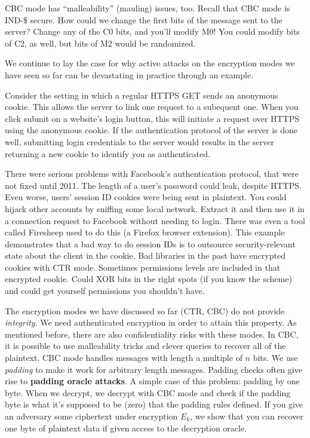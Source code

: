 CBC mode has ``malleability'' (mauling) issues, too. Recall that CBC mode is IND-\$ secure. How could we change the first bits of the message sent to the server?  Change any of the C0 bits, and you'll modify M0!
You could modify bits of C2, as well, but bits of M2 would be randomized.

We continue to lay the case for why active attacks on the encryption modes we have seen so far can be devastating in practice through an example.

\begin{example} Consider the setting in which a regular HTTPS GET sends an anonymous cookie. This allows the server to link one request to a subequent one. When you click submit on a website's login button, this will initiate a request over HTTPS using the anonymous cookie. If the authentication protocol of the server is done well, submitting login credentials to the server would results in the server returning a new cookie to identify you as authenticated.

There were serious problems with Facebook's authentication protocol, that were not fixed until 2011. The length of a user's password could leak, despite HTTPS.
Even worse, users' session ID cookies were being sent in plaintext. You could hijack other accounts by sniffing some local network. Extract it and then use it in a connection request to Facebook without needing to login. There was even a tool called Firesheep used to do this (a Firefox browser extension).
This example demonstrates that a bad way to do session IDs is to outsource security-relevant state about the client in the cookie.
Bad libraries in the past have encrypted cookies with CTR mode. Sometimes permissions levels are included in that encrypted cookie. Could XOR bits in the right spots (if you know the scheme) and could get yourself permissions you shouldn't have.
\end{example}


The encryption modes we have discussed so far (CTR, CBC) do not provide \emph{integrity}. We need authenticated encryption in order to attain this property. 
As mentioned before, there are also confidentiality risks with these modes. In CBC, it is possible to use malleability tricks and clever queries to recover all of the plaintext. 
CBC mode handles messages with length a multiple of $n$ bits. We use \emph{padding} to make it work for arbitrary length messages. Padding checks often give rise to {\bf padding oracle attacks}.
A simple case of this problem: padding by one byte. When we decrypt, we decrypt with CBC mode and check if the padding byte is what it's supposed to be (zero) that the padding rules defined. If you give an adversary some ciphertext under encryption $E_k$, we show that you can recover one byte of plaintext data if given access to the decryption oracle. 

